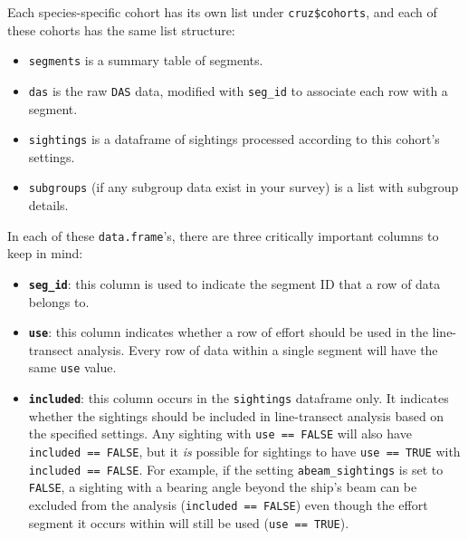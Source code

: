 \documentclass[
]{book}
\newenvironment{Shaded}{\begin{snugshade}}{\end{snugshade}}
\newcommand{\AttributeTok}[1]{\textcolor[rgb]{0.77,0.63,0.00}{#1}}
\newcommand{\DecValTok}[1]{\textcolor[rgb]{0.00,0.00,0.81}{#1}}
\newcommand{\FloatTok}[1]{\textcolor[rgb]{0.00,0.00,0.81}{#1}}
\newcommand{\FunctionTok}[1]{\textcolor[rgb]{0.00,0.00,0.00}{#1}}
\newcommand{\NormalTok}[1]{#1}
\newcommand{\SpecialCharTok}[1]{\textcolor[rgb]{0.00,0.00,0.00}{#1}}
\begin{document}
\begin{Shaded}
\end{Shaded}

Each species-specific cohort has its own list under \texttt{cruz\$cohorts}, and each of these cohorts has the same list structure:

\begin{itemize}
\item
  \texttt{segments} is a summary table of segments.
\item
  \texttt{das} is the raw \texttt{DAS} data, modified with \texttt{seg\_id} to associate each row with a segment.
\item
  \texttt{sightings} is a dataframe of sightings processed according to this cohort's settings.
\item
  \texttt{subgroups} (if any subgroup data exist in your survey) is a list with subgroup details.
\end{itemize}

In each of these \texttt{data.frame}'s, there are three critically important columns to keep in mind:

\begin{itemize}
\item
  \textbf{\texttt{seg\_id}}: this column is used to indicate the segment ID that a row of data belongs to.
\item
  \textbf{\texttt{use}}: this column indicates whether a row of effort should be used in the line-transect analysis. Every row of data within a single segment will have the same \texttt{use} value.
\item
  \textbf{\texttt{included}}: this column occurs in the \texttt{sightings} dataframe only. It indicates whether the sightings should be included in line-transect analysis based on the specified settings. Any sighting with \texttt{use\ ==\ FALSE} will also have \texttt{included\ ==\ FALSE}, but it \emph{is} possible for sightings to have \texttt{use\ ==\ TRUE} with \texttt{included\ ==\ FALSE}. For example, if the setting \texttt{abeam\_sightings} is set to \texttt{FALSE}, a sighting with a bearing angle beyond the ship's beam can be excluded from the analysis (\texttt{included\ ==\ FALSE}) even though the effort segment it occurs within will still be used (\texttt{use\ ==\ TRUE}).
\end{itemize}
\end{document}
